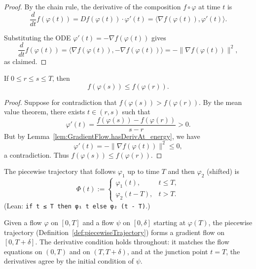 \begin{proof}
  \leanok{}
  By the chain rule, the derivative of the composition $f \circ \varphi$ at time $t$ is
  \[
    \frac{d}{dt} f(\varphi(t)) = Df(\varphi(t)) \cdot \varphi'(t) = \langle \nabla f(\varphi(t)), \varphi'(t) \rangle.
  \]

  Substituting the ODE $\varphi'(t) = -\nabla f(\varphi(t))$ gives
  \[
    \frac{d}{dt} f(\varphi(t)) = \langle \nabla f(\varphi(t)), -\nabla f(\varphi(t)) \rangle = -\|\nabla f(\varphi(t))\|^2,
  \]
  as claimed.
\end{proof}

\begin{lemma}\label{lem:GradientFlow.energy_antitone}
  \leanok{}
  If $0\le r\le s\le T$, then
  \[
    f(\varphi(s)) \le f(\varphi(r)).
  \]
\end{lemma}

\begin{proof}
  \leanok{}
  Suppose for contradiction that $f(\varphi(s)) > f(\varphi(r))$. By the mean value theorem, there exists $t \in (r, s)$
  such that
  \[
    \varphi'(t) = \frac{f(\varphi(s)) - f(\varphi(r))}{s - r} > 0.
  \]
  But by Lemma~\ref{lem:GradientFlow.hasDerivAt_energy}, we have
  \[
    \varphi'(t) = -\|\nabla f(\varphi(t))\|^2 \le 0,
  \]
  a contradiction. Thus $f(\varphi(s)) \le f(\varphi(r))$.
\end{proof}


\begin{definition}\label{def:piecewiseTrajectory}
  \leanok{}
  \uses{}
  The piecewise trajectory that follows $\varphi_1$ up to time $T$ and then $\varphi_2$ (shifted) is
  \[
    \Phi(t) :=
    \begin{cases}
      \varphi_1(t), & t\le T,\\
      \varphi_2(t-T), & t>T.
    \end{cases}
  \]
  (Lean: \texttt{if t ≤ T then φ₁ t else φ₂ (t - T)}.)
\end{definition}

\begin{definition}
  \label{def:gradientFlow_extend}
  \leanok{}
  Given a flow $\varphi$ on $[0,T]$ and a flow $\psi$ on $[0,\delta]$ starting at $\varphi(T)$,
  the piecewise trajectory (Definition~\ref{def:piecewiseTrajectory}) forms a gradient flow on $[0,T+\delta]$.
  The derivative condition holds throughout: it matches the flow equations on $(0,T)$ and on $(T,T+\delta)$,
  and at the junction point $t=T$, the derivatives agree by the initial condition of $\psi$.
\end{definition}

